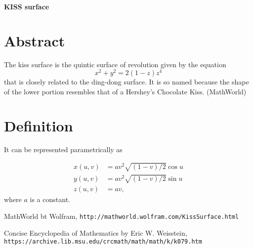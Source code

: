 \documentclass[12pt,dvipdfmx]{article}
\begin{document}
\begin{center}

{\bf \Large KISS surface}

\end{center}


\section{Abstract}

The kiss surface is the quintic surface of revolution given by the equation
\[
 x^2+y^2=2(1-z)z^4 	
\]
that is closely related to the ding-dong surface. It is so named because the shape of the lower portion resembles that of a Hershey's Chocolate Kiss. (MathWorld)

\section{Definition}

It can be represented parametrically as

\begin{align*}
x(u,v)	&=	av^2\sqrt{(1-v)/2}\cos u	\\
y(u,v)	&=	av^2\sqrt{(1-v)/2}\sin u	\\
z(u,v)	&=	av,
\end{align*}
where $a$ is a constant.


\begin{thebibliography}{9}

 MathWorld bt Wolfram, \verb|http://mathworld.wolfram.com/KissSurface.html|

 Concise Encyclopedia of Mathematics by Eric W. Weisstein, \verb|https://archive.lib.msu.edu/crcmath/math/math/k/k079.htm|

\end{thebibliography}
\end{document}
